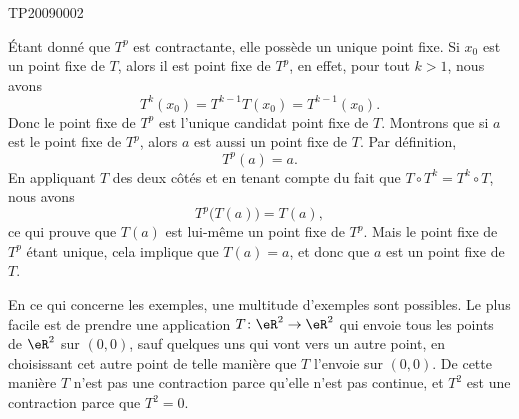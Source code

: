 
\begin{corrige}{TP20090002}

	Étant donné que $T^p$ est contractante, elle possède un unique point fixe. Si $x_0$ est un point fixe de $T$, alors il est point fixe de $T^p$, en effet, pour tout $k>1$, nous avons
	\begin{equation}
		T^k(x_0)=T^{k-1}T(x_0)=T^{k-1}(x_0).
	\end{equation}
	Donc le point fixe de $T^p$ est l'unique candidat point fixe de $T$. Montrons que si $a$ est le point fixe de $T^p$, alors $a$ est aussi un point fixe de $T$. Par définition,
	\begin{equation}
		T^p(a)=a.
	\end{equation}
	En appliquant $T$ des deux côtés et en tenant compte du fait que $T\circ T^k=T^k\circ T$, nous avons
	\begin{equation}
		T^p\big( T(a) \big)=T(a),
	\end{equation}
	ce qui prouve que $T(a)$ est lui-même un point fixe de $T^p$. Mais le point fixe de $T^p$ étant unique, cela implique que $T(a)=a$, et donc que $a$ est un point fixe de $T$.

	En ce qui concerne les exemples, une multitude d'exemples sont possibles. Le plus facile est de prendre une application $T\colon \eR^2\to \eR^2$ qui envoie tous les points de $\eR^2$ sur $(0,0)$, sauf quelques uns qui vont vers un autre point, en choisissant cet autre point de telle manière que $T$ l'envoie sur $(0,0)$. De cette manière $T$ n'est pas une contraction parce qu'elle n'est pas continue, et $T^2$ est une contraction parce que $T^2=0$.

\end{corrige}
